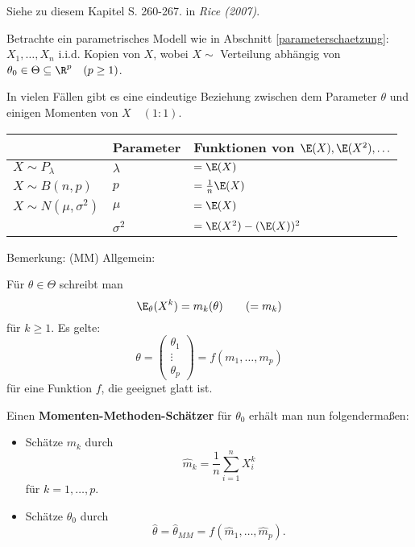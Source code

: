 \documentclass{tstextbook}
\begin{document}
\begin{book}
 Siehe zu diesem Kapitel S. 260-267. in	\textit{Rice (2007)}.
\end{book}


Betrachte ein parametrisches Modell wie in Abschnitt \ref{parameterschaetzung}:
$ X_1,\ldots,X_n $ i.i.d. Kopien von $ X $, wobei $ X \sim $ Verteilung abhängig von $ \theta_0 \in \Theta \subseteq \R^p \quad (p\ge1) $.

In vielen Fällen gibt es eine eindeutige Beziehung zwischen dem Parameter $ \theta $ und einigen Momenten von $ X \quad (1:1) $.

\begin{example}
	
	\begin{center}
	\begin{tabular}{l|ll}
								& Parameter 	& Funktionen von $ \E(X), \E(X^2),\ldots $ \\
		\midrule
		$ X\sim P_\lambda $ 	& $ \lambda	$	& $ = \E(X) $\\
		\midrule
		$ X\sim B(n,p) $ 		& $ p $			& $ = \frac{1}{n} \E(X) $\\
		\midrule
		$ X\sim N(\mu, \sigma^2) $ & $ \mu $	& $ = \E(X) $\\
								& $ \sigma^2 $	& $ = \E(X^2)-(\E(X))^2 $
	\end{tabular}
	\end{center}
\end{example}

	\begin{remark}
		Bemerkung: (MM) Allgemein:
	
		Für $ \theta \in \Theta $ schreibt man 
		\[
		\E_\theta(X^k) = m_k(\theta) \qquad (=m_k)
		\]
		für $ k\ge1 $. Es gelte: 
		\[
		\theta = \begin{pmatrix}
			\theta_1 \\ \vdots \\ \theta_p
		\end{pmatrix} = f\left(m_1,\ldots,m_p\right)
		\]
		für eine Funktion $ f $, die geeignet glatt ist.
		
	\end{remark}


Einen \textbf{Momenten-Methoden-Schätzer}  für $ \theta_0 $ erhält man nun folgendermaßen: 
	\begin{itemize}
		\item Schätze $ m_k $ durch \[ \hat{m}_k = \frac{1}{n} \sum_{i=1}^{n} X_i^k \] für $ k=1,\ldots,p $.
		\item Schätze $ \theta_0 $ durch \[\hat{\theta} = {\hat{\theta}}_{MM} = f\left(\hat{m}_1,\ldots,\hat{m}_p \right). \]
	\end{itemize}
\end{document}
